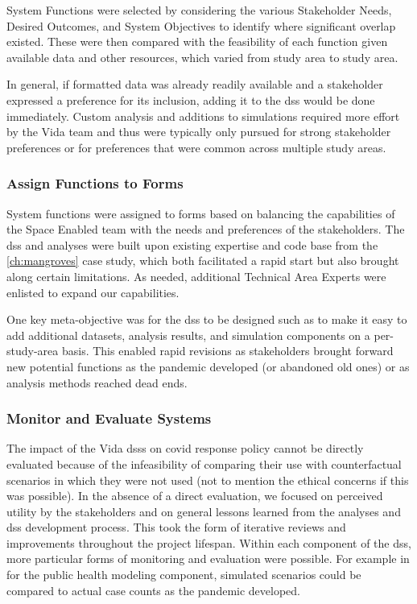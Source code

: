 System Functions were selected by considering the various Stakeholder Needs, Desired Outcomes, and System Objectives to identify where significant overlap existed. These were then compared with the feasibility of each function given available data and other resources, which varied from study area to study area.

In general, if formatted data was already readily available and a stakeholder expressed a preference for its inclusion, adding it to the \ac{dss} would be done immediately. Custom analysis and additions to simulations required more effort by the Vida team and thus were typically only pursued for strong stakeholder preferences or for preferences that were common across multiple study areas.

\subsubsection{Assign Functions to Forms}

System functions were assigned to forms based on balancing the capabilities of the Space Enabled team with the needs and preferences of the stakeholders. The \ac{dss} and analyses were built upon existing expertise and code base from the \ref{ch:mangroves} case study, which both facilitated a rapid start but also brought along certain limitations. As needed, additional Technical Area Experts were enlisted to expand our capabilities. 

One key meta-objective was for the \ac{dss} to be designed such as to make it easy to add additional datasets, analysis results, and simulation components on a per-study-area basis. This enabled rapid revisions as stakeholders brought forward new potential functions as the pandemic developed (or abandoned old ones) or as analysis methods reached dead ends.

\subsubsection{Monitor and Evaluate Systems}

The impact of the Vida \acp{dss} on \ac{covid} response policy cannot be directly evaluated because of the infeasibility of comparing their use with counterfactual scenarios in which they were not used (not to mention the ethical concerns if this was possible). In the absence of a direct evaluation, we focused on perceived utility by the stakeholders and on general lessons learned from the analyses and \ac{dss} development process. This took the form of iterative reviews and improvements throughout the project lifespan. Within each component of the \ac{dss}, more particular forms of monitoring and evaluation were possible. For example in for the public health modeling component, simulated scenarios could be compared to actual case counts as the pandemic developed.


